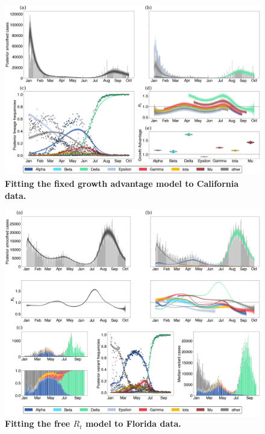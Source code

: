 \documentclass[11pt,oneside,letterpaper]{article}
\begin{document}
\begin{figure}
  \centering
  \includegraphics[width=\linewidth]{figs/fixed_growth_California.png}
  \caption{\textbf{Fitting the fixed growth advantage model to California data.}}%
  \label{fig:fixed_growth_California}
\end{figure}

\begin{figure}
  \centering
  \includegraphics[width=\linewidth]{figs/free_rt_Florida.png}
  \caption{\textbf{Fitting the free $R_{t}$ model to Florida data.}}%
  \label{fig:free_rt_Florida}
\end{figure}
\end{document}
